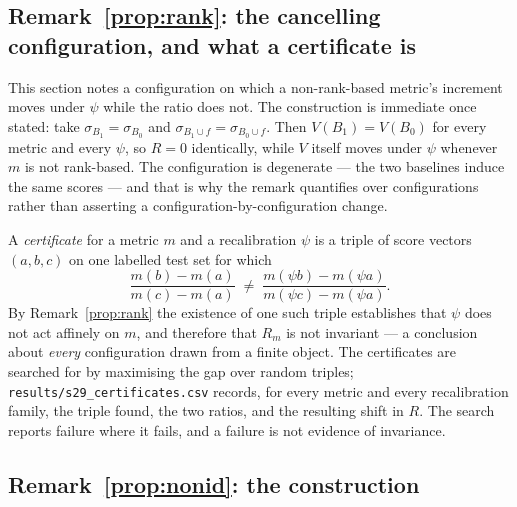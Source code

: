 \subsection*{Remark~\ref{prop:rank}: the cancelling configuration, and
what a certificate is}

This section notes a configuration on which a non-rank-based
metric's increment moves under $\psi$ while the ratio does not. The
construction is immediate once stated: take $\sigma_{B_1} = \sigma_{B_0}$ and
$\sigma_{B_1 \cup f} = \sigma_{B_0 \cup f}$. Then $V(B_1) = V(B_0)$ for every
metric and every $\psi$, so $R = 0$ identically, while $V$ itself moves under
$\psi$ whenever $m$ is not rank-based. The configuration is degenerate --- the
two baselines induce the same scores --- and that is why the remark
quantifies over configurations rather than asserting a
configuration-by-configuration change.

A \emph{certificate} for a metric $m$ and a recalibration $\psi$ is a
triple of score vectors $(a,b,c)$ on one labelled test set for which
\[
\frac{m(b) - m(a)}{m(c) - m(a)}
\;\neq\;
\frac{m(\psi b) - m(\psi a)}{m(\psi c) - m(\psi a)} .
\]
By Remark~\ref{prop:rank} the existence of one such triple establishes
that $\psi$ does not act affinely on $m$, and therefore that $R_m$ is not
invariant --- a conclusion about \emph{every} configuration drawn from a
finite object. The certificates are searched for by maximising the gap over
random triples; \texttt{results/s29\_certificates.csv} records, for every
metric and every recalibration family, the triple found, the two ratios,
and the resulting shift in $R$. The search reports failure where it fails, and
a failure is not evidence of invariance.

\subsection*{Remark~\ref{prop:nonid}: the construction}

